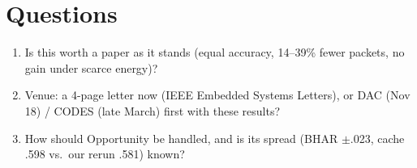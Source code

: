 \documentclass[10pt]{article}
\begin{document}
\section{Questions}
\begin{enumerate}
\item Is this worth a paper as it stands (equal accuracy, 14--39\% fewer packets, no gain under scarce energy)?
\item Venue: a 4-page letter now (IEEE Embedded Systems Letters), or DAC (Nov 18) / CODES (late March) first with these results?
\item How should Opportunity be handled, and is its spread (BHAR $\pm$.023, cache .598 vs.\ our rerun .581) known?
\end{enumerate}
\end{document}
